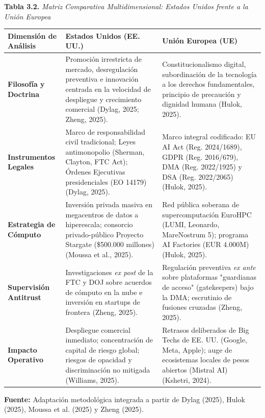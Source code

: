 \begin{table}[htbp]
\centering
\small
\textbf{Tabla 3.2.} \textit{Matriz Comparativa Multidimensional: Estados Unidos frente a la Unión Europea}\\[0.25cm]
\label{tab:matriz_comparativa_occidente}
\begin{tabularx}{\textwidth}{p{3.2cm} p{5.5cm} p{5.5cm}}
\toprule
\textbf{Dimensión de Análisis} & \textbf{Estados Unidos (EE. UU.)} & \textbf{Unión Europea (UE)} \\
\midrule
\textbf{Filosofía y Doctrina} & Promoción irrestricta de mercado, desregulación preventiva e innovación centrada en la velocidad de despliegue y crecimiento comercial (Dylag, 2025; Zheng, 2025). & Constitucionalismo digital, subordinación de la tecnología a los derechos fundamentales, principio de precaución y dignidad humana (Hulok, 2025). \\
\addlinespace
\textbf{Instrumentos Legales} & Marco de responsabilidad civil tradicional; Leyes antimonopolio (Sherman, Clayton, FTC Act); Órdenes Ejecutivas presidenciales (EO 14179) (Dylag, 2025). & Marco integral codificado: EU AI Act (Reg. 2024/1689), GDPR (Reg. 2016/679), DMA (Reg. 2022/1925) y DSA (Reg. 2022/2065) (Hulok, 2025). \\
\addlinespace
\textbf{Estrategia de Cómputo} & Inversión privada masiva en megacentros de datos a hiperescala; consorcio privado-público Proyecto Stargate (\$500.000 millones) (Moussa et al., 2025). & Red pública soberana de supercomputación EuroHPC (LUMI, Leonardo, MareNostrum 5); programa AI Factories (EUR 4.000M) (Hulok, 2025). \\
\addlinespace
\textbf{Supervisión Antitrust} & Investigaciones \textit{ex post} de la FTC y DOJ sobre acuerdos de cómputo en la nube e inversión en startups de frontera (Zheng, 2025). & Regulación preventiva \textit{ex ante} sobre plataformas "guardianas de acceso" (gatekeepers) bajo la DMA; escrutinio de fusiones cruzadas (Zheng, 2025). \\
\addlinespace
\textbf{Impacto Operativo} & Despliegue comercial inmediato; concentración de capital de riesgo global; riesgos de opacidad y discriminación no mitigada (Williams, 2025). & Retrasos deliberados de Big Techs de EE. UU. (Google, Meta, Apple); auge de ecosistemas locales de pesos abiertos (Mistral AI) (Kshetri, 2024). \\
\bottomrule
\end{tabularx}
\begin{center}
\scriptsize \textbf{Fuente:} Adaptación metodológica integrada a partir de Dylag (2025), Hulok (2025), Moussa et al. (2025) y Zheng (2025).
\end{center}
\end{table}


